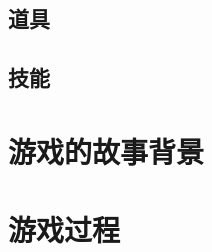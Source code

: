\documentclass{tstextbook}
\begin{document}
\section{道具}


\section{技能}

\chapter{游戏的故事背景}

\begin{summary}

\end{summary}

\chapter{游戏过程}

\begin{summary}

\end{summary}


\printbibliography{}


\printindex
\end{document}
